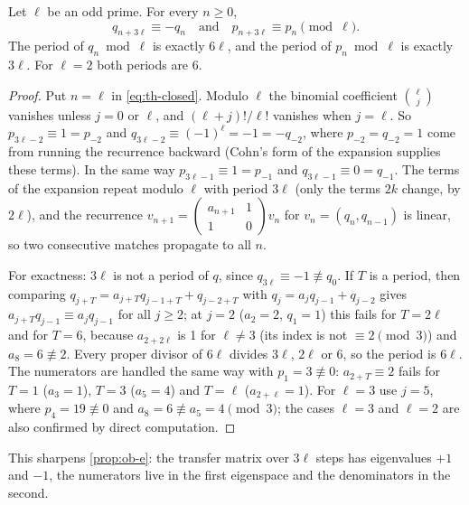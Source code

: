 \begin{proposition}\label{prop:th-flip}
Let $\ell$ be an odd prime. For every $n \ge 0$,
\[
  q_{n+3\ell} \equiv -q_n \quad\text{and}\quad p_{n+3\ell} \equiv p_n \pmod \ell .
\]
The period of $q_n \bmod \ell$ is exactly $6\ell$, and the period of $p_n \bmod \ell$ is exactly $3\ell$. For $\ell = 2$ both periods are 6.
\end{proposition}

\begin{proof}
Put $n = \ell$ in \eqref{eq:th-closed}. Modulo $\ell$ the binomial coefficient $\binom{\ell}{j}$ vanishes unless $j = 0$ or $\ell$, and $(\ell+j)!/\ell!$ vanishes when $j = \ell$. So $p_{3\ell-2} \equiv 1 = p_{-2}$ and $q_{3\ell-2} \equiv (-1)^\ell = -1 = -q_{-2}$, where $p_{-2} = q_{-2} = 1$ come from running the recurrence backward (Cohn's form of the expansion supplies these terms). In the same way $p_{3\ell-1} \equiv 1 = p_{-1}$ and $q_{3\ell-1} \equiv 0 = q_{-1}$. The terms of the expansion repeat modulo $\ell$ with period $3\ell$ (only the terms $2k$ change, by $2\ell$), and the recurrence $v_{n+1} = \left(\begin{smallmatrix} a_{n+1} & 1\\ 1 & 0\end{smallmatrix}\right)v_n$ for $v_n = (q_n, q_{n-1})$ is linear, so two consecutive matches propagate to all $n$.

For exactness: $3\ell$ is not a period of $q$, since $q_{3\ell} \equiv -1 \not\equiv q_0$. If $T$ is a period, then comparing $q_{j+T} = a_{j+T}q_{j-1+T} + q_{j-2+T}$ with $q_j = a_jq_{j-1} + q_{j-2}$ gives $a_{j+T}q_{j-1} \equiv a_jq_{j-1}$ for all $j \ge 2$; at $j = 2$ ($a_2 = 2$, $q_1 = 1$) this fails for $T = 2\ell$ and for $T = 6$, because $a_{2+2\ell}$ is 1 for $\ell \ne 3$ (its index is not $\equiv 2 \pmod 3$) and $a_8 = 6 \not\equiv 2$. Every proper divisor of $6\ell$ divides $3\ell$, $2\ell$ or $6$, so the period is $6\ell$. The numerators are handled the same way with $p_1 = 3 \not\equiv 0$: $a_{2+T} \equiv 2$ fails for $T = 1$ ($a_3 = 1$), $T = 3$ ($a_5 = 4$) and $T = \ell$ ($a_{2+\ell} = 1$). For $\ell = 3$ use $j = 5$, where $p_4 = 19 \not\equiv 0$ and $a_8 = 6 \not\equiv a_5 = 4 \pmod 3$; the cases $\ell = 3$ and $\ell = 2$ are also confirmed by direct computation.
\end{proof}

This sharpens \cref{prop:ob-e}: the transfer matrix over $3\ell$ steps has eigenvalues $+1$ and $-1$, the numerators live in the first eigenspace and the denominators in the second.

